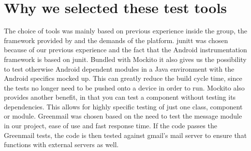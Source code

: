 \pagebreak

\section{Why we selected these test tools}
The choice of tools was mainly based on previous experience inside the group, the framework provided by and the demands of the platform. 
\newline
\newline
\gls{junit}t was chosen because of our previous experience and the fact that the Android instrumentation framework is based on \gls{junit}. Bundled with Mockito it also gives us the possibility to test otherwise Android dependent modules in a Java environment with the Android specifics mocked up. This can greatly reduce the build cycle time, since the tests no longer need to be pushed onto a device in order to run. Mockito also provides another benefit, in that you can test a component without testing its dependencies. This allows for highly specific testing of just one class, component or module.
\newline
\newline
Greenmail was chosen based on the need to test the message module in our project, ease of use and fast response time. If the code passes the Greenmail tests, the code is then tested against gmail’s mail server to ensure that functions with external servers as well. 
